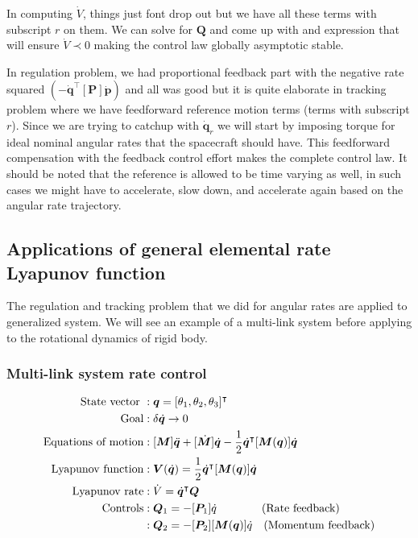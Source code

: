 \documentclass{article}
\begin{document}
In computing $\dot{V}$, things just font drop out but we have all these terms with subscript $r$ on them. We can solve for $\bm{Q}$ and come up with and expression that will ensure $\dot{V}\prec0$ making the control law globally asymptotic stable. 

In regulation problem, we had proportional feedback part with the negative rate squared $(-\dot{\bm{q}}^{\intercal}[\bm{P}]\dot{\bm{p}})$ and all was good but it is quite elaborate in tracking problem where we have feedforward reference motion terms (terms with subscript $r$). Since we are trying to catchup with $\dot{\bm{q}}_{r}$ we will start by imposing torque for ideal nominal angular rates that the spacecraft should have. This feedforward compensation with the feedback control effort makes the complete control law. It should be noted that the reference is allowed to be time varying as well, in such cases we might have to accelerate, slow down, and accelerate again based on the angular rate trajectory.

\subsection{Applications of general elemental rate Lyapunov function}
The regulation and tracking problem that we did for angular rates are applied to generalized system. We will see an example of a multi-link system before applying to the rotational dynamics of rigid body.

\subsubsection{Multi-link system rate control}
\begin{equation*}
  \begin{split}
    \textnormal{State vector }&:\bm{q}=[\theta_{1},\theta_{2},\theta_{3}]^{\intercal}\\
    \textnormal{Goal}&:\delta\dot{\bm{q}}\rightarrow0\\
    \textnormal{Equations of motion}&:[\bm{M}]\ddot{\bm{q}}+[\dot{\bm{M}}]\dot{\bm{q}}-\frac{1}{2}\dot{\bm{q}}^{\intercal}[\bm{M}(\bm{q})]\dot{\bm{q}}\\
    \textnormal{Lyapunov function}&:\bm{V}(\dot{\bm{q}})=\frac{1}{2}\dot{\bm{q}}^{\intercal}[\bm{M}(\bm{q})]\dot{\bm{q}}\\
    \textnormal{Lyapunov rate}&:\dot{V}=\dot{\bm{q}}^{\intercal}\bm{Q}\\
    \textnormal{Controls}&:\bm{Q}_{1}=-[\bm{P}_{1}]\dot{q}\quad\quad\quad\quad\textnormal{(Rate feedback)}\\
    &:\bm{Q}_{2}=-[\bm{P}_{2}][\bm{M}(\bm{q})]\dot{q}\quad\textnormal{(Momentum feedback)}\\
  \end{split}
\end{equation*}
\end{document}

